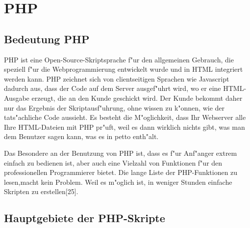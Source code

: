 \section{PHP}
\subsection{Bedeutung PHP}

PHP ist eine Open-Source-Skriptsprache 
f"ur den allgemeinen Gebrauch, 
die speziell f"ur die Webprogrammierung entwickelt wurde 
und in HTML integriert werden kann. 
 PHP zeichnet sich von clientseitigen Sprachen
  wie Javascript dadurch aus, 
  dass der Code auf dem Server ausgef"uhrt wird, 
  wo er eine HTML-Ausgabe erzeugt, 
  die an den Kunde geschickt wird. 
  Der Kunde bekommt daher nur das Ergebnis der Skriptausf"uhrung, 
  ohne wissen zu k"onnen, wie der tats"achliche Code aussieht. 
  Es besteht  die M"oglichkeit, 
  dass Ihr Webserver alle Ihre HTML-Dateien mit PHP pr"uft, 
  weil es dann wirklich nichts gibt, 
  was man dem Benutzer sagen kann, was es in petto enth"alt.

Das Besondere an der Benutzung von PHP ist, 
dass es f"ur Anf"anger extrem einfach zu bedienen ist,
 aber auch eine Vielzahl von Funktionen f"ur den 
 professionellen Programmierer bietet.  
 Die lange Liste der PHP-Funktionen zu lesen,macht kein Problem.
 Weil es m"oglich ist,
 in weniger Stunden einfache Skripten zu erstellen[25].

\subsection{Hauptgebiete der PHP-Skripte}

